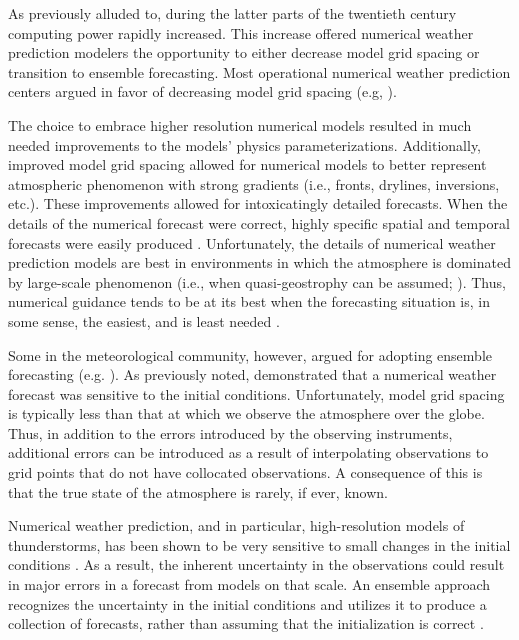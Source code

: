 As previously alluded to, during the latter parts of the twentieth century computing power rapidly increased.
This increase offered numerical weather prediction modelers the opportunity to either decrease model grid spacing or transition to ensemble forecasting.
Most operational numerical weather prediction centers argued in favor of decreasing model grid spacing (e.g, \citealp{McPherson1991, WMO1992}).


The choice to embrace higher resolution numerical models resulted in much needed improvements to the models' physics parameterizations.
Additionally, improved model grid spacing allowed for numerical models to better represent atmospheric phenomenon with strong gradients (i.e., fronts, drylines, inversions, etc.).
These improvements allowed for intoxicatingly detailed forecasts.
When the details of the numerical forecast were correct, highly specific spatial and temporal forecasts were easily produced \citep{Droegemeier1990}.
Unfortunately, the details of numerical weather prediction models are best in environments in which the atmosphere is dominated by large-scale phenomenon (i.e., when quasi-geostrophy can be assumed; \citealp{Antolik1989}).
Thus, numerical guidance tends to be at its best when the forecasting situation is, in some sense, the easiest, and is least needed \citep{Brooks1993}.


Some in the meteorological community, however, argued for adopting ensemble forecasting (e.g. \citealp{Brooks1992a, Brooks1993}).
As previously noted, \cite{Lorenz1963, Lorenz1965, Lorenz1968} demonstrated that a numerical weather forecast was sensitive to the initial conditions.
Unfortunately, model grid spacing is typically less than that at which we observe the atmosphere over the globe.
Thus, in addition to the errors introduced by the observing instruments, additional errors can be introduced as a result of interpolating observations to grid points that do not have collocated observations.
A consequence of this is that the true state of the atmosphere is rarely, if ever, known.


Numerical weather prediction, and in particular, high-resolution models of thunderstorms, has been shown to be very sensitive to small changes in the initial conditions \citep{Lorenz1963, Lorenz1965, Lorenz1968, Brooks1992a, Brooks1992b}.
As a result, the inherent uncertainty in the observations could result in major errors in a forecast from models on that scale.
An ensemble approach recognizes the uncertainty in the initial conditions and utilizes it to produce a collection of forecasts, rather than assuming that the initialization is correct \citep{Brooks1992a}.


